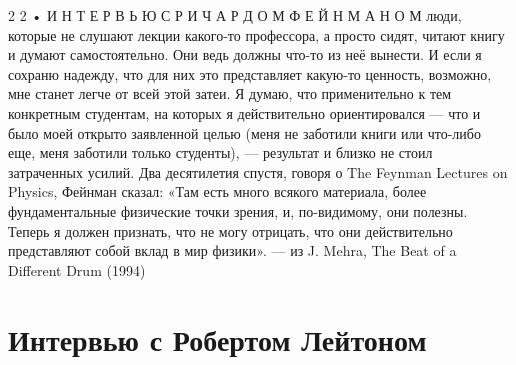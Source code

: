 \documentclass[11pt,oneside]{article}
\begin{document}
2 2 • И Н Т Е Р В Ь Ю  С  Р И Ч А Р Д О М  Ф Е Й Н М А Н О М люди, которые не слушают лекции какого-то профессора, а просто сидят, читают книгу и думают самостоятельно. Они ведь должны что-то из неё вынести. И если я сохраню надежду, что для них это представляет какую-то ценность, возможно, мне станет легче от всей этой затеи. Я думаю, что применительно к тем конкретным студентам, на которых я действительно ориентировался --- что и было моей открыто заявленной целью (меня не заботили книги или что-либо еще, меня заботили только студенты), --- результат и близко не стоил затраченных усилий.\emph{ } Два десятилетия спустя, говоря о The Feynman Lectures on Physics, Фейнман сказал: «Там есть много всякого материала, более фундаментальные физические точки зрения, и, по-видимому, они полезны. Теперь я должен признать, что не могу отрицать, что они действительно представляют собой вклад в мир физики». --- из J. Mehra, The Beat of a Different Drum (1994)\par



\clearpage


\section*{Интервью с Робертом Лейтоном}



\label{tips-sec-7-интервью-с-робертом-лейтоном}

\end{document}
